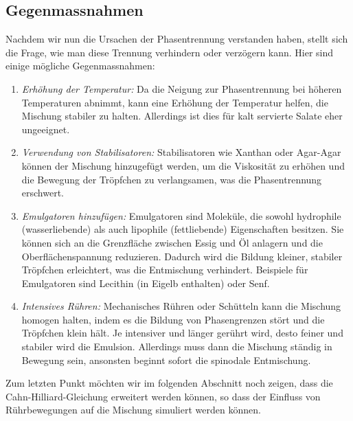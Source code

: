 \subsection{Gegenmassnahmen}
Nachdem wir nun die Ursachen der Phasentrennung verstanden haben,
stellt sich die Frage,
wie man diese Trennung verhindern oder verzögern kann.
Hier sind einige mögliche Gegenmassnahmen:
\begin{enumerate}
\item \emph{Erhöhung der Temperatur:}
Da die Neigung zur Phasentrennung bei höheren Temperaturen abnimmt,
kann eine Erhöhung der Temperatur helfen,
die Mischung stabiler zu halten.
Allerdings ist dies für kalt servierte Salate eher ungeeignet.
\item \emph{Verwendung von Stabilisatoren:}
Stabilisatoren wie Xanthan oder Agar-Agar können der Mischung hinzugefügt werden,
um die Viskosität zu erhöhen und die Bewegung der Tröpfchen zu verlangsamen,
was die Phasentrennung erschwert.
\item \emph{Emulgatoren hinzufügen:}
Emulgatoren sind Moleküle,
die sowohl hydrophile (wasserliebende)
als auch lipophile (fettliebende) Eigenschaften besitzen.
Sie können sich an die Grenzfläche zwischen Essig und Öl anlagern
und die Oberflächenspannung reduzieren.
Dadurch wird die Bildung kleiner,
stabiler Tröpfchen erleichtert,
was die Entmischung verhindert.
Beispiele für Emulgatoren sind Lecithin (in Eigelb enthalten) oder Senf.
\item \emph{Intensives Rühren:}
Mechanisches Rühren oder Schütteln kann die Mischung homogen halten,
indem es die Bildung von Phasengrenzen stört und die Tröpfchen klein hält.
Je intensiver und länger gerührt wird,
desto feiner und stabiler wird die Emulsion.
Allerdings muss dann die Mischung ständig in Bewegung sein,
ansonsten beginnt sofort die spinodale Entmischung.
\end{enumerate}
Zum letzten Punkt möchten wir im folgenden Abschnitt noch zeigen,
dass die Cahn-Hilliard-Gleichung erweitert werden können,
so dass der Einfluss von Rührbewegungen auf die Mischung simuliert werden können.

